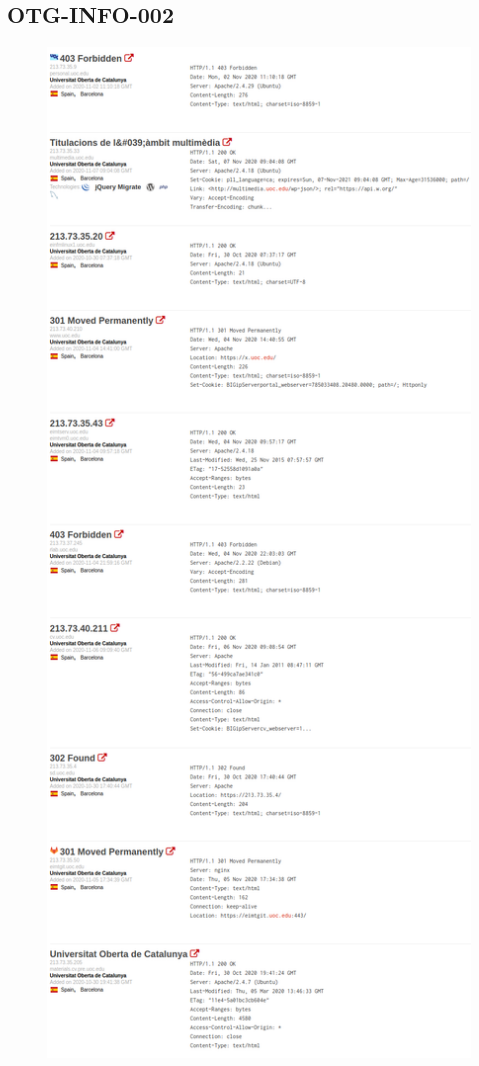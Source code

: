 \documentclass[10pt,a4paper]{article}
\begin{document}
\pagebreak

\subsection{OTG-INFO-002}
\label{ann:otg-info-002}
\begin{figure}[h!]
  \centering
  \includegraphics[scale=0.25]{shodan1.png}

\end{figure}
\end{document}
